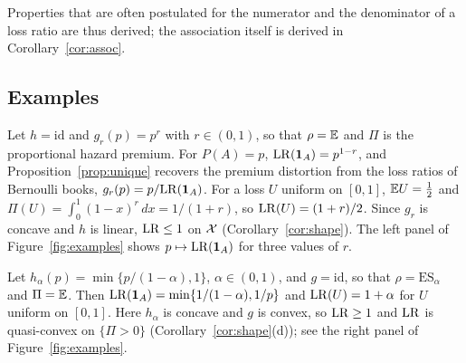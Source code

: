 Properties that are often postulated for the numerator and the denominator of a loss ratio are thus derived;
the association itself is derived in
Corollary~\ref{cor:assoc}.

\subsection{Examples}

\begin{example}\label{ex:PH}
Let $h=\mathrm{id}$ and $g_r(p)=p^r$ with $r\in(0,1)$, so that $\rho=\mathbb E$ and $\Pi$ is the proportional hazard
premium. For $P(A)=p$, $\mathrm{LR}(\mathbf 1_A)=p^{1-r}$, and Proposition~\ref{prop:unique} recovers the premium distortion
from the loss ratios of Bernoulli books, $g_r(p)=p/\mathrm{LR}(\mathbf 1_A)$. For a loss $U$ uniform on $[0,1]$,
$\mathbb E U=\tfrac12$ and $\Pi(U)=\int_0^1(1-x)^r\,dx=1/(1+r)$, so $\mathrm{LR}(U)=(1+r)/2$. Since $g_r$ is concave and $h$ is
linear, $\mathrm{LR}\le1$ on $\mathcal X$ (Corollary~\ref{cor:shape}). The left panel of Figure~\ref{fig:examples} shows
$p\mapsto\mathrm{LR}(\mathbf 1_A)$ for three values of $r$.
\end{example}

\begin{example}\label{ex:ES}
Let $h_\alpha(p)=\min\{p/(1-\alpha),1\}$, $\alpha\in(0,1)$, and $g=\mathrm{id}$, so that $\rho=\mathrm{ES}_\alpha$ and
$\Pi=\mathbb E$. Then $\mathrm{LR}(\mathbf 1_A)=\min\{1/(1-\alpha),1/p\}$ and $\mathrm{LR}(U)=1+\alpha$ for $U$ uniform on $[0,1]$. Here $h_\alpha$ is
concave and $g$ is convex, so $\mathrm{LR}\ge1$ and $\mathrm{LR}$ is quasi-convex on $\{\Pi>0\}$
(Corollary~\ref{cor:shape}(d)); see the right panel of Figure~\ref{fig:examples}.
\end{example}

